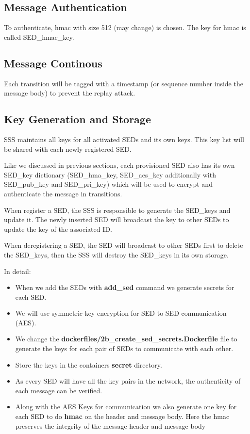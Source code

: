 \documentclass[11pt,oneside,onecolumn,letterpaper]{article}
\begin{document}
\subsection{Message Authentication}
To authenticate, hmac with size 512 (may change) is chosen.
The key for hmac is called SED\_hmac\_key.

\subsection{Message Continous}
Each transition will be tagged with a timestamp (or sequence number inside the message body) to prevent the replay attack.

\subsection{Key Generation and Storage}
SSS maintains all keys for all activated SEDs and its own keys.
This key list will be shared with each newly registered SED.

Like we discussed in previous sections, each provisioned SED also has its own SED\_key dictionary (SED\_hma\_key, SED\_aes\_key additionally with SED\_pub\_key and SED\_pri\_key) which will be used to encrypt and authenticate the message in transitions.

When register a SED, the SSS is responsible to generate the SED\_keys and update it.
The newly inserted SED will broadcast the key to other SEDs to update the key of the associated ID.

When deregistering a SED, the SED will broadcast to other SEDs first to delete the SED\_keys, then the SSS will destroy the SED\_keys in its own storage.

In detail:
\begin{itemize}
  \item When we add the SEDs with \textbf{add\_sed}  
      command we generate secrets for each SED. 
      \item We will use symmetric key encryption for SED to SED communication (AES).
      \item We change the  \textbf{dockerfiles/2b\_create\_sed\_secrets.Dockerfile} file to generate the keys for each pair of SEDs to communicate with each other.
      \item Store the keys in the containers \textbf{secret} directory.
      \item As every SED will have all the key pairs in the network, the authenticity of each message can be verified.
      \item Along with the AES Keys for communication we also generate one key for each SED to do \textbf{hmac} on the header and message body. 
      Here the hmac preserves the integrity of the message header and message body
\end{itemize}
\end{document}
